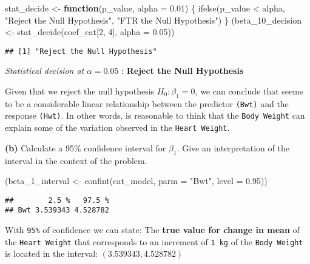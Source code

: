 \documentclass[
]{article}
\newenvironment{Shaded}{\begin{snugshade}}{\end{snugshade}}
\newcommand{\AttributeTok}[1]{\textcolor[rgb]{0.77,0.63,0.00}{#1}}
\newcommand{\ControlFlowTok}[1]{\textcolor[rgb]{0.13,0.29,0.53}{\textbf{#1}}}
\newcommand{\DecValTok}[1]{\textcolor[rgb]{0.00,0.00,0.81}{#1}}
\newcommand{\FloatTok}[1]{\textcolor[rgb]{0.00,0.00,0.81}{#1}}
\newcommand{\FunctionTok}[1]{\textcolor[rgb]{0.00,0.00,0.00}{#1}}
\newcommand{\NormalTok}[1]{#1}
\newcommand{\OtherTok}[1]{\textcolor[rgb]{0.56,0.35,0.01}{#1}}
\newcommand{\SpecialCharTok}[1]{\textcolor[rgb]{0.00,0.00,0.00}{#1}}
\newcommand{\StringTok}[1]{\textcolor[rgb]{0.31,0.60,0.02}{#1}}
\begin{document}
\begin{Shaded}
\begin{Highlighting}[]
\NormalTok{stat\_decide }\OtherTok{\textless{}{-}} \ControlFlowTok{function}\NormalTok{(p\_value, }\AttributeTok{alpha =} \FloatTok{0.01}\NormalTok{) \{}
  \FunctionTok{ifelse}\NormalTok{(p\_value }\SpecialCharTok{\textless{}}\NormalTok{ alpha, }\StringTok{"Reject the Null Hypothesis"}\NormalTok{, }\StringTok{"FTR the Null Hypothesis"}\NormalTok{)}
\NormalTok{\}}
\NormalTok{(beta\_10\_decision }\OtherTok{\textless{}{-}} \FunctionTok{stat\_decide}\NormalTok{(coef\_cat[}\DecValTok{2}\NormalTok{, }\DecValTok{4}\NormalTok{], }\AttributeTok{alpha =} \FloatTok{0.05}\NormalTok{))}
\end{Highlighting}
\end{Shaded}

\begin{verbatim}
## [1] "Reject the Null Hypothesis"
\end{verbatim}

\emph{Statistical decision at } \(\alpha = 0.05\) : \textbf{Reject the
Null Hypothesis}

Given that we reject the null hypothesis \(H_0: \beta_1 = 0\), we can
conclude that seems to be a considerable linear relationship between the
predictor \texttt{(Bwt)} and the response \texttt{(Hwt)}. In other
words, is reasonable to think that the \texttt{Body\ Weight} can explain
some of the variation observed in the \texttt{Heart\ Weight}.

\textbf{(b)} Calculate a 95\% confidence interval for \(\beta_1\). Give
an interpretation of the interval in the context of the problem.

\begin{Shaded}
\begin{Highlighting}[]
\NormalTok{(beta\_1\_interval }\OtherTok{\textless{}{-}} \FunctionTok{confint}\NormalTok{(cat\_model, }\AttributeTok{parm =} \StringTok{"Bwt"}\NormalTok{, }\AttributeTok{level =} \FloatTok{0.95}\NormalTok{))}
\end{Highlighting}
\end{Shaded}

\begin{verbatim}
##        2.5 %   97.5 %
## Bwt 3.539343 4.528782
\end{verbatim}

With \texttt{95\%} of confidence we can state: The \textbf{true value
for change in mean} of the \texttt{Heart\ Weight} that corresponds to an
increment of \texttt{1\ kg} of the \texttt{Body\ Weight} is located in
the interval: \(\left(3.539343, 4.528782\right)\)
\end{document}
